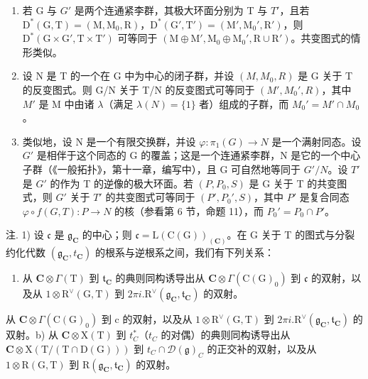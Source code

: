 \begin{enumerate}
\def\labelenumi{\arabic{enumi})}
\setcounter{enumi}{1}
\item
  若 G 与 \(G'\) 是两个连通紧李群，其极大环面分别为 T 与 \(T'\)，且若 \(\mathrm{D}^{*}(\mathrm{G},\mathrm{T})=(\mathrm{M},\mathrm{M}_{0},\mathrm{R})\)，\(\mathrm{D}^{*}(\mathrm{G}',\mathrm{T}')=(\mathrm{M}',\mathrm{M}_{0}',\mathrm{R}')\)，则 \(\mathrm{D}^{*}(\mathrm{G}\times\mathrm{G}',\mathrm{T}\times\mathrm{T}')\) 可等同于 \((\mathrm{M}\oplus\mathrm{M}',\mathrm{M}_{0}\oplus\mathrm{M}_{0}',\mathrm{R}\cup\mathrm{R}')\)。共变图式的情形类似。
\item
  设 N 是 T 的一个在 G 中为中心的闭子群，并设 \((M, M_{0}, R)\) 是 G 关于 T 的反变图式。则 G/N 关于 T/N 的反变图式可等同于 \((M', M_{0}', R)\)，其中 \(M'\) 是 M 中由诸 \(\lambda\)（满足 \(\lambda(N) = \{1\}\) 者）组成的子群，而 \(M_{0}' = M' \cap M_{0}\)。
\item
  类似地，设 N 是一个有限交换群，并设 \(\varphi : \pi_{1}(G) \to N\) 是一个满射同态。设 \(G'\) 是相伴于这个同态的 G 的覆盖；这是一个连通紧李群，N 是它的一个中心子群（《一般拓扑》，第十一章，编写中），且 G 可自然地等同于 \(G'/N\)。设 \(T'\) 是 \(G'\) 的作为 T 的逆像的极大环面。若 \((P, P_{0}, S)\) 是 G 关于 T 的共变图式，则 \(G'\) 关于 \(T'\) 的共变图式可等同于 \((P', P_{0}', S)\)，其中 \(P'\) 是复合同态 \(\varphi \circ f(G, T) : P \to N\) 的核（参看第 6 节，命题 11），而 \(P_{0}' = P_{0} \cap P'\)。
\end{enumerate}

注. 1) 设 \(\mathfrak{c}\) 是 \(\mathfrak{g}_{\mathbf{C}}\) 的中心；则 \(\mathfrak{c} = \mathrm{L}(\mathrm{C}(\mathrm{G}))_{(\mathbf{C})}\)。在 G 关于 T 的图式与分裂约化代数 \((\mathfrak{g}_{\mathbf{C}}, t_{\mathbf{C}})\) 的根系与逆根系之间，我们有下列关系：

\begin{enumerate}
\def\labelenumi{\alph{enumi})}
\tightlist
\item
  从 \(\mathbf{C} \otimes \Gamma(\mathrm{T})\) 到 \(\mathfrak{t}_{\mathbf{C}}\) 的典则同构诱导出从 \(\mathbf{C} \otimes \Gamma(\mathrm{C}(\mathrm{G})_0)\) 到 \(\mathfrak{c}\) 的双射，以及从 \(1 \otimes \mathrm{R}^{\vee}(\mathrm{G}, \mathrm{T})\) 到 \(2\pi i.\mathrm{R}^{\vee}(\mathfrak{g}_{\mathbf{C}}, \mathfrak{t}_{\mathbf{C}})\) 的双射。
\end{enumerate}

从 \(\mathbf{C}\otimes\varGamma(\mathrm{C}(\mathrm{G})_{0})\) 到 c 的双射，以及从 \(1\otimes\mathrm{R}^{\vee}(\mathrm{G},\mathrm{T})\) 到 \(2\pi i.\mathrm{R}^{\vee}(\mathfrak{g}_{\mathbf{C}},\mathfrak{t}_{\mathbf{C}})\) 的双射。b) 从 \(\mathbf{C}\otimes\mathrm{X}(\mathrm{T})\) 到 \(t_{C}^{*}\)（\(t_{C}\) 的对偶）的典则同构诱导出从 \(\mathbf{C}\otimes\mathrm{X}(\mathrm{T}/(\mathrm{T}\cap\mathrm{D}(\mathrm{G})))\) 到 \(t_{C}\cap\mathcal{D}(\mathfrak{g})_{C}\) 的正交补的双射，以及从 \(1\otimes\mathrm{R}(\mathrm{G},\mathrm{T})\) 到 \(\mathrm{R}(\mathfrak{g}_{\mathbf{C}},\mathfrak{t}_{\mathbf{C}})\) 的双射。

